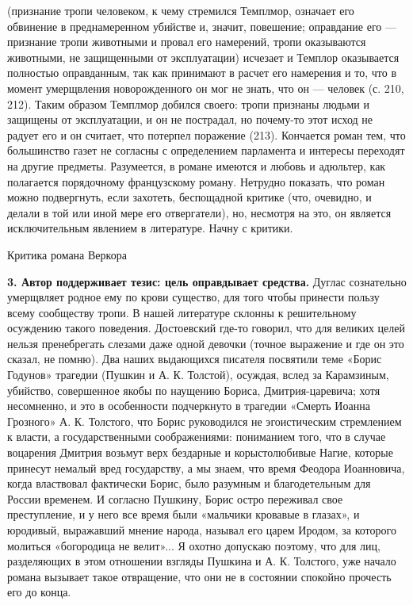 (признание тропи  человеком, к  чему стремился Темплмор,  означает его
обвинение в  преднамеренном убийстве и, значит,  повешение; оправдание
его  ---  признание тропи  животными  и  провал его  намерений,  тропи
оказываются  животными, не  защищенными  от  эксплуатации) исчезает  и
Темплор оказывается полностью оправданным,  так как принимают в расчет
его намерения и то, что в  момент умерщвления новорожденного он мог не
знать,  что он  ---  человек  (с. 210,  212).  Таким образом  Темплмор
добился своего: тропи признаны людьми и защищены от эксплуатации, и он
не пострадал, но почему-то этот исход  не радует его и он считает, что
потерпел поражение  (213). Кончается роман тем,  что большинство газет
не согласны с  определением парламента и интересы  переходят на другие
предметы.  Разумеется,  в романе  имеются  и  любовь и  адюльтер,  как
полагается  порядочному французскому  роману.  Нетрудно показать,  что
роман  можно подвергнуть,  если  захотеть,  беспощадной критике  (что,
очевидно, и делали в той или  иной мере его отвергатели), но, несмотря
на  это, он  является исключительным  явлением в  литературе. Начну  с
критики.

Критика романа Веркора

\textbf{3.  Автор  поддерживает  тезис:  цель  оправдывает  средства.}
Дуглас сознательно умерщвляет  родное ему по крови  существо, для того
чтобы  принести  пользу всему  сообществу  тропи.  В нашей  литературе
склонны к решительному осуждению  такого поведения. Достоевский где-то
говорил, что для великих целей  нельзя пренебрегать слезами даже одной
девочки (точное  выражение и где он  это сказал, не помню).  Два наших
выдающихся писателя посвятили теме  «Борис Годунов» трагедии (Пушкин и
А. К.  Толстой), осуждая,  вслед за Карамзиным,  убийство, совершенное
якобы по наущению  Бориса, Дмитрия-царевича; хотя несомненно,  и это в
особенности  подчеркнуто в  трагедии  «Смерть Иоанна  Грозного» А.  К.
Толстого, что Борис руководился не эгоистическим стремлением к власти,
а  государственными  соображениями:  пониманием  того,  что  в  случае
воцарения  Дмитрия  возьмут  верх бездарные  и  корыстолюбивые  Нагие,
которые  принесут немалый  вред  государству, а  мы  знаем, что  время
Феодора Иоанновича, когда властвовал фактически Борис, было разумным и
благодетельным для  России временем.  И согласно Пушкину,  Борис остро
переживал  свое  преступление,  и  у него  все  время  были  «мальчики
кровавые в глазах», и юродивый,  выражавший мнение народа, называл его
царем Иродом, за  которого молиться «богородица не  велит»... Я охотно
допускаю поэтому,  что для лиц,  разделяющих в этом  отношении взгляды
Пушкина и А. К. Толстого, уже начало романа вызывает такое отвращение,
что они не в состоянии спокойно прочесть его до конца.

